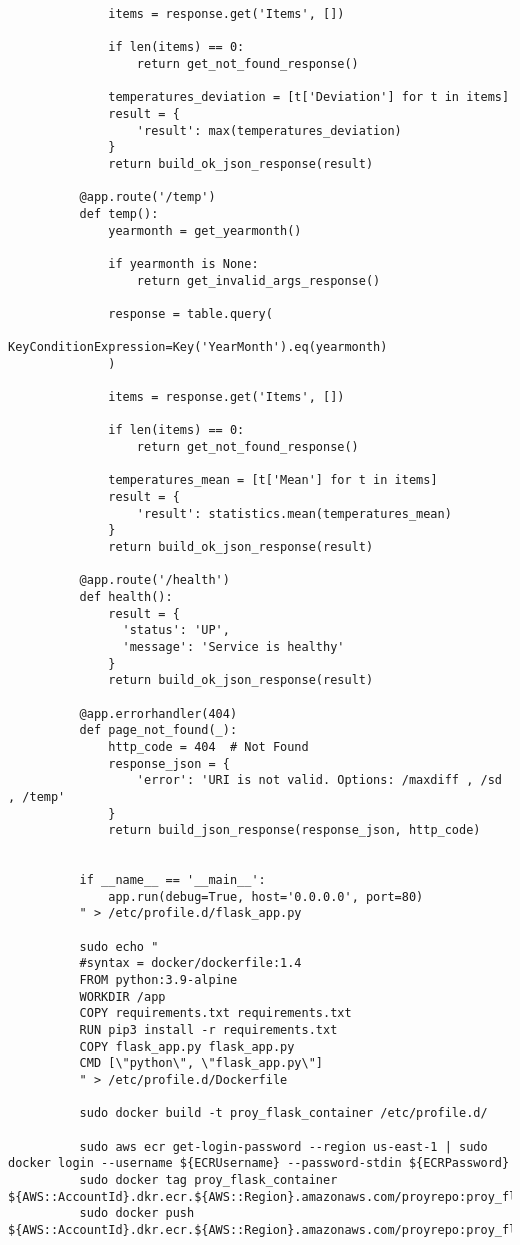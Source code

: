 \begin{verbatim}
              items = response.get('Items', [])

              if len(items) == 0:
                  return get_not_found_response()
              
              temperatures_deviation = [t['Deviation'] for t in items]
              result = {
                  'result': max(temperatures_deviation)
              }
              return build_ok_json_response(result)

          @app.route('/temp')
          def temp():
              yearmonth = get_yearmonth()

              if yearmonth is None:
                  return get_invalid_args_response()

              response = table.query(
                  KeyConditionExpression=Key('YearMonth').eq(yearmonth)
              )

              items = response.get('Items', [])

              if len(items) == 0:
                  return get_not_found_response()

              temperatures_mean = [t['Mean'] for t in items]
              result = {
                  'result': statistics.mean(temperatures_mean)
              }
              return build_ok_json_response(result)

          @app.route('/health')
          def health():
              result = {
                'status': 'UP',
                'message': 'Service is healthy'
              }
              return build_ok_json_response(result)

          @app.errorhandler(404)
          def page_not_found(_):
              http_code = 404  # Not Found
              response_json = {
                  'error': 'URI is not valid. Options: /maxdiff , /sd , /temp'
              }
              return build_json_response(response_json, http_code)


          if __name__ == '__main__':
              app.run(debug=True, host='0.0.0.0', port=80)
          " > /etc/profile.d/flask_app.py

          sudo echo "
          #syntax = docker/dockerfile:1.4
          FROM python:3.9-alpine
          WORKDIR /app
          COPY requirements.txt requirements.txt
          RUN pip3 install -r requirements.txt
          COPY flask_app.py flask_app.py
          CMD [\"python\", \"flask_app.py\"]
          " > /etc/profile.d/Dockerfile

          sudo docker build -t proy_flask_container /etc/profile.d/

          sudo aws ecr get-login-password --region us-east-1 | sudo docker login --username ${ECRUsername} --password-stdin ${ECRPassword}
          sudo docker tag proy_flask_container ${AWS::AccountId}.dkr.ecr.${AWS::Region}.amazonaws.com/proyrepo:proy_flask_container
          sudo docker push ${AWS::AccountId}.dkr.ecr.${AWS::Region}.amazonaws.com/proyrepo:proy_flask_container
\end{verbatim}

